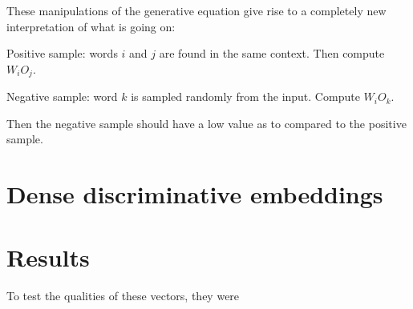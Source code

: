 \documentclass{article}
\begin{document}
	These manipulations of the generative equation give rise to a completely new interpretation of what is going on:
	
	Positive sample: words $i$ and $j$ are found in the same context. Then compute $W_i O_j$.
	
	Negative sample: word $k$ is sampled randomly from the input. Compute $W_i O_k$. 
	
	Then the negative sample should have a low value as to compared to the positive sample.
	
	\section{Dense discriminative embeddings}
	
	
	
	\section{Results}
	
	To test the qualities of these vectors, they were
	
	
%	
%	
%	
%	
	
%	
%	
%	
%	
	
	
	
	{}
	
	
\end{document}
